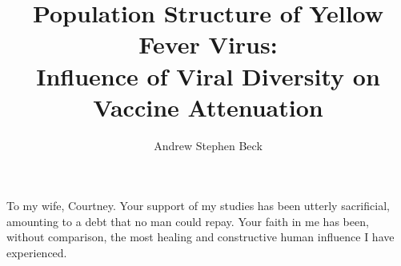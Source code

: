 \documentclass[11pt]{report}	%
\author{Andrew Stephen Beck}  	%
\title{Population Structure of Yellow Fever Virus:\\ 
		Influence of Viral Diversity on Vaccine Attenuation}
\theoremstyle{definition}
\theoremstyle{remark}
\begin{document}
\pagebreak
\copyrightpage          %


%
%
%
\commcertpage           %

\titlepage              %



%

\begin{dedication}
%
To my wife, Courtney. Your support of my studies has been utterly 
sacrificial, amounting to a debt that no man could repay.  Your 
faith in me has been, without comparison, the most healing and 
constructive human influence I have experienced.
\end{dedication}
\end{document}
